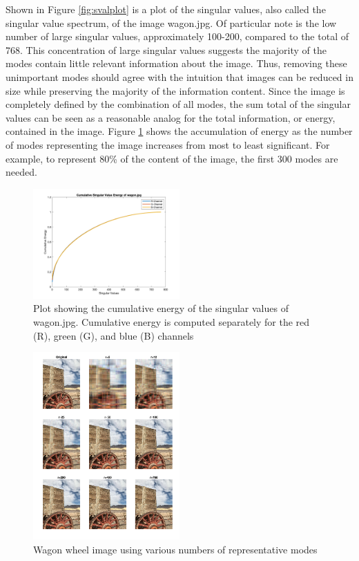 \documentclass[conference]{IEEEtran}
\begin{document}
    Shown in Figure \ref{fig:svalplot} is a plot of the singular values, also called the singular value spectrum, of the image wagon.jpg. Of particular note is the low number of large singular values, approximately 100-200, compared to the total of 768. This concentration of large singular values suggests the majority of the modes contain little relevant information about the image. Thus, removing these unimportant modes should agree with the intuition that images can be reduced in size while preserving the majority of the information content. Since the image is completely defined by the combination of all modes, the sum total of the singular values can be seen as a reasonable analog for the total information, or energy, contained in the image. Figure \ref{fig:svalenergyplot} shows the accumulation of energy as the number of modes representing the image increases from most to least significant. For example, to represent 80\% of the content of the image, the first 300 modes are needed.

    \begin{figure}[t]
    \includegraphics[width=0.5\textwidth]{sv_energy_wagon_rgb}
    \caption{Plot showing the cumulative energy of the singular values of wagon.jpg. Cumulative energy is computed separately for the red (R), green (G), and blue (B) channels}
    \label{fig:svalenergyplot}
    \end{figure}
    
    \begin{figure}[t]
    \includegraphics[width=0.5\textwidth]{show_different_r_wagon}
    \caption{Wagon wheel image using various numbers of representative modes}
    \label{fig:showwagondiffr}
    \end{figure}
\end{document}
